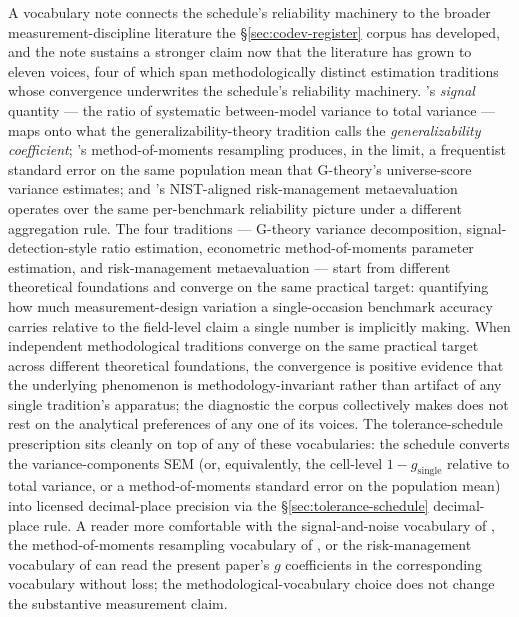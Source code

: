 \documentclass[11pt]{article}
\begin{document}
A vocabulary note connects the schedule's reliability machinery to the broader measurement-discipline literature the §\ref{sec:codev-register} corpus has developed, and the note sustains a stronger claim now that the literature has grown to eleven voices, four of which span methodologically distinct estimation traditions whose convergence underwrites the schedule's reliability machinery. \citet{heineman2025signal}'s \emph{signal} quantity --- the ratio of systematic between-model variance to total variance --- maps onto what the generalizability-theory tradition calls the \emph{generalizability coefficient}; \citet{lior2025reliableeval}'s method-of-moments resampling produces, in the limit, a frequentist standard error on the same population mean that G-theory's universe-score variance estimates; and \citet{mcgregor2025benchrisk}'s NIST-aligned risk-management metaevaluation operates over the same per-benchmark reliability picture under a different aggregation rule. The four traditions --- G-theory variance decomposition, signal-detection-style ratio estimation, econometric method-of-moments parameter estimation, and risk-management metaevaluation --- start from different theoretical foundations and converge on the same practical target: quantifying how much measurement-design variation a single-occasion benchmark accuracy carries relative to the field-level claim a single number is implicitly making. When independent methodological traditions converge on the same practical target across different theoretical foundations, the convergence is positive evidence that the underlying phenomenon is methodology-invariant rather than artifact of any single tradition's apparatus; the diagnostic the corpus collectively makes does not rest on the analytical preferences of any one of its voices. The tolerance-schedule prescription sits cleanly on top of any of these vocabularies: the schedule converts the variance-components SEM (or, equivalently, the cell-level $1 - g_{\mathrm{single}}$ relative to total variance, or a method-of-moments standard error on the population mean) into licensed decimal-place precision via the §\ref{sec:tolerance-schedule} decimal-place rule. A reader more comfortable with the signal-and-noise vocabulary of \citet{heineman2025signal}, the method-of-moments resampling vocabulary of \citet{lior2025reliableeval}, or the risk-management vocabulary of \citet{mcgregor2025benchrisk} can read the present paper's $g$ coefficients in the corresponding vocabulary without loss; the methodological-vocabulary choice does not change the substantive measurement claim.
\end{document}
